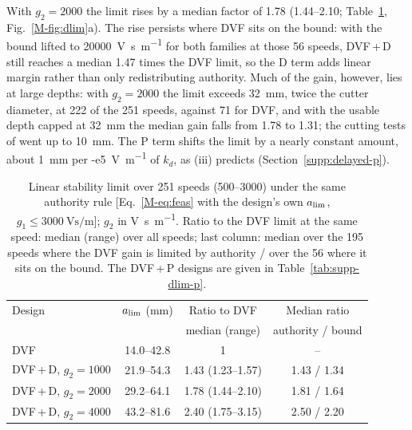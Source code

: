 With $g_2=2000$ the limit rises by a median factor of 1.78 (1.44--2.10; Table~\ref{tab:dlim}, Fig.~\ref{M-fig:dlim}a). The rise persists where DVF sits on the bound: with the bound lifted to \SI{20000}{\volt\second\per\metre} for both families at those 56 speeds, DVF\,+\,D still reaches a median 1.47 times the DVF limit, so the D term adds linear margin rather than only redistributing authority. Much of the gain, however, lies at large depths: with $g_2=2000$ the limit exceeds \SI{32}{\milli\metre}, twice the cutter diameter, at 222 of the 251 speeds, against 71 for DVF, and with the usable depth capped at \SI{32}{\milli\metre} the median gain falls from 1.78 to 1.31; the cutting tests of \citet{ozsoy2026robust} went up to \SI{10}{\milli\metre}. The P term shifts the limit by a nearly constant amount, about \SI{1}{\milli\metre} per \SI{-e5}{\volt\per\metre} of $k_d$, as (iii) predicts (Section~\ref{supp:delayed-p}).

\begin{table}[!htbp]
  \centering
  \caption{Linear stability limit over 251 speeds (\SIrange{500}{3000}{\rpm}) under the same authority rule [Eq.~\eqref{M-eq:feas} with the design's own $a_{\lim}$, $g_1\le\SI{3000}{\volt\second\per\metre}$]; $g_2$ in \si{\volt\second\per\metre}. Ratio to the DVF limit at the same speed: median (range) over all speeds; last column: median over the 195 speeds where the DVF gain is limited by authority / over the 56 where it sits on the bound. The DVF\,+\,P designs are given in Table~\ref{tab:supp-dlim-p}.}
  \label{tab:dlim}
  \small
  \begin{tabular}{@{}lccc@{}}
    \toprule
    Design & $a_{\lim}$ (\si{\milli\metre}) & Ratio to DVF & Median ratio\\
     & & median (range) & authority / bound\\
    \midrule
    DVF & 14.0--42.8 & 1 & --\\
    DVF\,+\,D, $g_2=1000$ & 21.9--54.3 & 1.43 (1.23--1.57) & 1.43 / 1.34\\
    DVF\,+\,D, $g_2=2000$ & 29.2--64.1 & 1.78 (1.44--2.10) & 1.81 / 1.64\\
    DVF\,+\,D, $g_2=4000$ & 43.2--81.6 & 2.40 (1.75--3.15) & 2.50 / 2.20\\
    \bottomrule
  \end{tabular}
\end{table}



